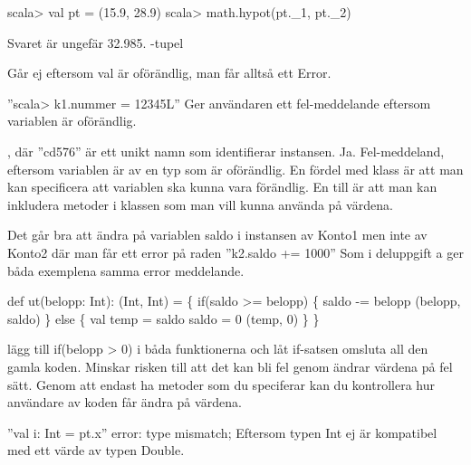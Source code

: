 

\ExerciseSolution{\ExeWeekFOUR}

\Task %
\Subtask  
\begin{REPLnonum}
scala> val pt = (15.9, 28.9)
scala> math.hypot(pt.\_1, pt.\_2)
\end{REPLnonum}
Svaret är ungefär 32.985.
\Subtask  {}
\Subtask  {}
\Subtask  {}
\Subtask  {}
\Subtask  {}
\Subtask  {}
-tupel

\Task %
\Subtask  {}
\Subtask  Går ej eftersom val är oförändlig, man får alltså ett Error.

\Task %
\Subtask  
''scala> k1.nummer = 12345L'' Ger användaren ett fel-meddelande eftersom variablen är oförändlig.

\Task %
\Subtask  {}, där ''cd576'' är ett unikt namn som identifierar instansen.
\Subtask  Ja.
\Subtask  Fel-meddeland, eftersom variablen är av en typ som är oförändlig.
\Subtask  En fördel med klass är att man kan specificera att variablen ska kunna vara förändlig. En till är att man kan inkludera metoder i klassen som man vill kunna använda på värdena.

\Task %
\Subtask 
Det går bra att ändra på variablen saldo i instansen av Konto1 men inte av Konto2 där man får ett error på raden ''k2.saldo += 1000''
\Subtask 
Som i deluppgift a ger båda exemplena samma error meddelande.
\Subtask 
\begin{REPLnonum}
def ut(belopp: Int): (Int, Int) = \{
	if(saldo >= belopp) \{
		saldo -= belopp
		(belopp, saldo)
	\} else \{
		val temp = saldo
		saldo = 0
		(temp, 0)
	\}
\}
\end{REPLnonum}
\Subtask 
lägg till if(belopp > 0) i båda funktionerna och låt if-satsen omsluta all den gamla koden.
\Subtask 
Minskar risken till att det kan bli fel genom ändrar värdena på fel sätt. Genom att endast ha metoder som du speciferar kan du kontrollera hur användare av koden får ändra på värdena.

\Task %
\Subtask 
''val i: Int = pt.x'' error: type mismatch;
Eftersom typen Int ej är kompatibel med ett värde av typen Double.

